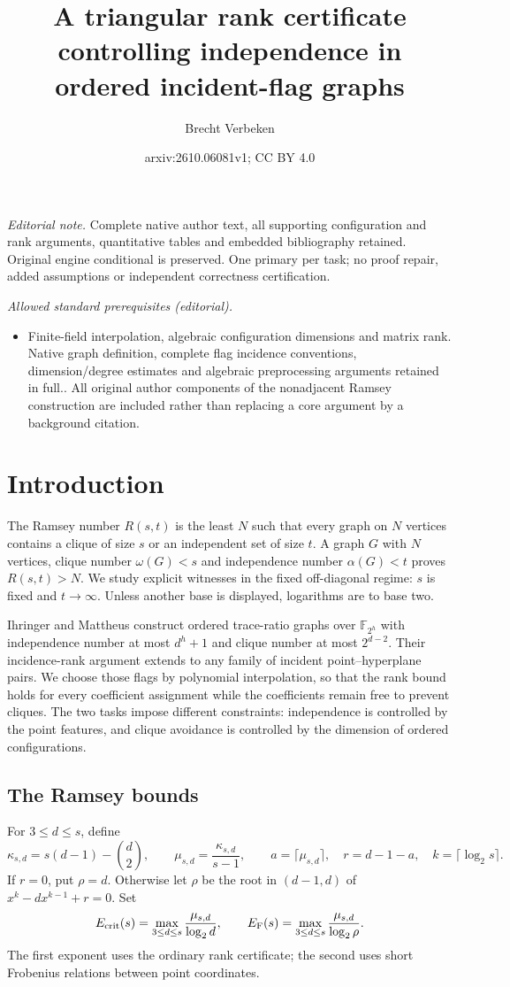 \documentclass[11pt,a4paper]{article}
\title{A triangular rank certificate controlling independence in ordered incident-flag graphs}
\author{Brecht Verbeken}
\date{arxiv:2610.06081v1; CC BY 4.0}
\newcommand{\F}{\mathbb F}
\theoremstyle{definition}
\theoremstyle{remark}
\numberwithin{equation}{section}
\begin{document}
\maketitle
\noindent\textit{Editorial note.} Complete native author text, all supporting configuration and rank arguments, quantitative tables and embedded bibliography retained. Original engine conditional is preserved. One primary per task; no proof repair, added assumptions or independent correctness certification.\par\medskip
\noindent\textit{Allowed standard prerequisites (editorial).}\begin{itemize}
\item Finite-field interpolation, algebraic configuration dimensions and matrix rank. Native graph definition, complete flag incidence conventions, dimension/degree estimates and algebraic preprocessing arguments retained in full.. All original author components of the nonadjacent Ramsey construction are included rather than replacing a core argument by a background citation.
\end{itemize}\medskip
\section{Introduction}\label{sec:intro}
The Ramsey number $R(s,t)$ is the least $N$ such that every graph on $N$ vertices contains a clique of size $s$ or an independent set of size $t$. A graph $G$ with $N$ vertices, clique number $\omega(G)<s$ and independence number $\alpha(G)<t$ proves $R(s,t)>N$. We study explicit witnesses in the fixed off-diagonal regime: $s$ is fixed and $t\to\infty$. Unless another base is displayed, logarithms are to base two.

Ihringer and Mattheus \cite{IM} construct ordered trace-ratio graphs over $\F_{2^h}$ with independence number at most $d^h+1$ and clique number at most $2^{d-2}$. Their incidence-rank argument extends to any family of incident point--hyperplane pairs. We choose those flags by polynomial interpolation, so that the rank bound holds for every coefficient assignment while the coefficients remain free to prevent cliques. The two tasks impose different constraints: independence is controlled by the point features, and clique avoidance is controlled by the dimension of ordered configurations.

\subsection{The Ramsey bounds}
For $3\le d\le s$, define
\[
\kappa_{s,d}=s(d-1)-\binom d2,\qquad
\mu_{s,d}=\frac{\kappa_{s,d}}{s-1},\qquad
a=\lceil\mu_{s,d}\rceil,\quad r=d-1-a,\quad k=\lceil\log_2s\rceil.
\]
If $r=0$, put $\rho=d$. Otherwise let $\rho$ be the root in $(d-1,d)$ of $x^k-dx^{k-1}+r=0$. Set
\[
E_{\rm crit}(s)=\max_{3\le d\le s}\frac{\mu_{s,d}}{\log_2d},\qquad
E_{\rm F}(s)=\max_{3\le d\le s}\frac{\mu_{s,d}}{\log_2\rho}.
\]
The first exponent uses the ordinary rank certificate; the second uses short Frobenius relations between point coordinates.
\end{document}
